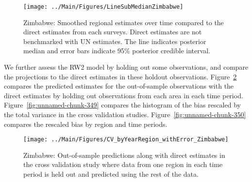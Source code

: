 \documentclass[12pt]{article}\usepackage[]{graphicx}\usepackage[]{color}
\newenvironment{knitrout}{}{} %
\begin{document}
\begin{knitrout}
\color{fgcolor}\begin{figure}[bht]

{\centering \texttt{[image: ../Main/Figures/LineSubMedianZimbabwe]} 

}

\caption[Zimbabwe]{Zimbabwe: Smoothed regional estimates over time compared to the direct estimates from each surveys. Direct estimates are not benchmarked with UN estimates. The line indicates posterior median and error bars indicate 95\% posterior credible interval.}\label{fig:unnamed-chunk-347}
\end{figure}


\end{knitrout}
We further assess the RW2 model by holding out some observations, and compare the projections to the direct estimates in these holdout observations. Figure~\ref{fig:unnamed-chunk-348} compares the predicted estimates for the out-of-sample observations  with the direct estimates by holding out observations from each area in each time period.  Figure~\ref{fig:unnamed-chunk-349} compares the histogram of the bias rescaled by the total variance in the cross validation studies. Figure~\ref{fig:unnamed-chunk-350} compares the rescaled bias by region and time periods.



 
\begin{knitrout}
\color{fgcolor}\begin{figure}[bht]

{\centering \texttt{[image: ../Main/Figures/CV\_byYearRegion\_withError\_Zimbabwe]} 

}

\caption[Zimbabwe]{Zimbabwe: Out-of-sample predictions along with direct estimates in the cross validation study where data from one region in each time period is held out and predicted using the rest of the data.}\label{fig:unnamed-chunk-348}
\end{figure}


\end{knitrout}
\end{document}
